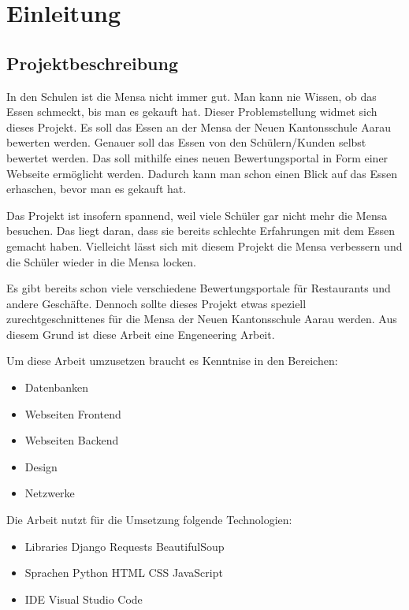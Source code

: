 \chapter{Einleitung}\label{chap:einleit}
\section{Projektbeschreibung}\label{sec:projektbeschreibung}

In den Schulen ist die Mensa nicht immer gut. Man kann nie Wissen, ob das Essen
schmeckt, bis man es gekauft hat. Dieser Problemstellung widmet sich dieses
Projekt. Es soll das Essen an der Mensa der Neuen Kantonsschule Aarau bewerten
werden. Genauer soll das Essen von den Schülern/Kunden selbst bewertet werden.
Das soll mithilfe eines neuen Bewertungsportal in Form einer Webseite ermöglicht
werden. Dadurch kann man schon einen Blick auf das Essen erhaschen, bevor man es
gekauft hat.

Das Projekt ist insofern spannend, weil viele Schüler gar nicht mehr die Mensa
besuchen. Das liegt daran, dass sie bereits schlechte Erfahrungen mit dem Essen
gemacht haben. Vielleicht lässt sich mit diesem Projekt die Mensa verbessern und
die Schüler wieder in die Mensa locken.

Es gibt bereits schon viele verschiedene Bewertungsportale für Restaurants und
andere Geschäfte. Dennoch sollte dieses Projekt etwas speziell
zurechtgeschnittenes für die Mensa der Neuen Kantonsschule Aarau werden.
Aus diesem Grund ist diese Arbeit eine Engeneering Arbeit.

Um diese Arbeit umzusetzen braucht es Kenntnise in den Bereichen:
\begin{itemize}
    \item Datenbanken
    \item Webseiten Frontend
    \item Webseiten Backend
    \item Design
    \item Netzwerke
\end{itemize}

Die Arbeit nutzt für die Umsetzung folgende Technologien:
\begin{itemize}
    \item Libraries
    \subitem Django
    \subitem Requests
    \subitem BeautifulSoup
    \item Sprachen
    \subitem Python
    \subitem HTML
    \subitem CSS
    \subitem JavaScript
    \item IDE
    \subitem Visual Studio Code
\end{itemize}


